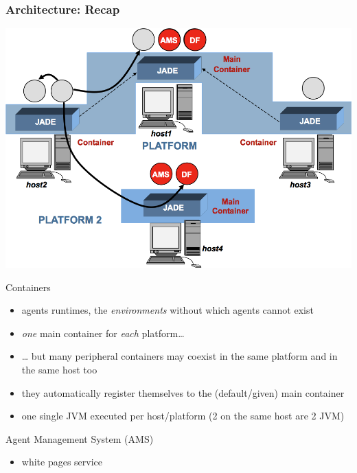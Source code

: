 \documentclass{beamer}\mode<presentation>{\usetheme{AMSCesenaPurpleAndGold}}
\begin{document}
\begin{frame}[c,allowframebreaks]\frametitle{\jade{} Architecture: Recap}
    \begin{center}
        \includegraphics[width=.75\textwidth]{res/img/jade_archi}
    \end{center}
    \begin{block}{Containers}
        \begin{itemize}
            \item \alert{agents runtimes}, the \emph{environments} without which agents cannot exist
            \item \emph{one} main container for \emph{each} \jade{} platform\ldots
            \item \ldots{} but many peripheral containers may coexist in the same platform and in the same host too
            \item they automatically register themselves to the (default/given) main container
            \item one single JVM executed per host/platform (2 \jade{} on the same host are 2 JVM)
        \end{itemize}
    \end{block}
    \begin{block}{Agent Management System (AMS)}
        \begin{itemize}
            \item \jade{} \alert{white pages} service

\end{itemize}
\end{block}
\end{frame}
\end{document}
